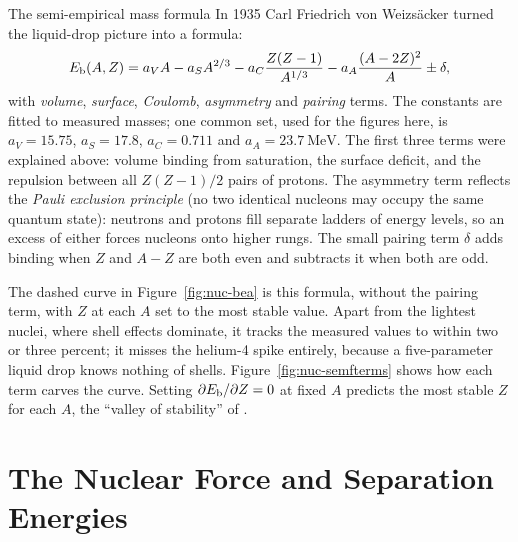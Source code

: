 \begin{remarkbox}{The semi-empirical mass formula}\label{rem:nuc-semf}
In 1935 Carl Friedrich von Weizs\"acker turned the liquid-drop picture into a formula:
\[
E_{\mathrm{b}}(A,Z)=a_VA-a_SA^{2/3}-a_C\frac{Z(Z-1)}{A^{1/3}}-a_A\frac{(A-2Z)^2}{A}\pm\delta,
\]
with \emph{volume}, \emph{surface}, \emph{Coulomb}, \emph{asymmetry} and \emph{pairing} terms. The
constants are fitted to measured masses; one common set, used for the figures here, is $a_V=15.75$,
$a_S=17.8$, $a_C=0.711$ and $a_A=\SI{23.7}{\MeV}$. The first three terms were explained above: volume
binding from saturation, the surface deficit, and the repulsion between all $Z(Z-1)/2$ pairs of protons.
The asymmetry term reflects the \emph{Pauli exclusion principle} (no two identical nucleons may occupy
the same quantum state): neutrons and protons fill separate ladders of energy levels, so an excess of
either forces nucleons onto higher rungs. The small pairing term $\delta$ adds binding when $Z$ and $A-Z$
are both even and subtracts it when both are odd.

The dashed curve in Figure~\ref{fig:nuc-bea} is this formula, without the pairing term, with $Z$ at each
$A$ set to the most stable value. Apart from the lightest nuclei, where shell effects dominate, it
tracks the measured values to within two or three percent; it misses the helium-4 spike entirely,
because a five-parameter liquid drop knows nothing of shells. Figure~\ref{fig:nuc-semfterms} shows how
each term carves the curve. Setting $\partial E_{\mathrm{b}}/\partial Z=0$ at fixed $A$ predicts the most stable $Z$
for each $A$, the ``valley of stability'' of .
\end{remarkbox}

\begin{figure}[htbp]
\centering
{}
\end{figure}

\section{The Nuclear Force and Separation Energies}\label{sec:nuc-force}

